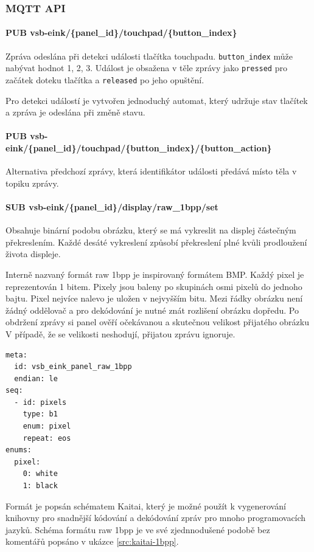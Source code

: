 \subsubsection*{MQTT API}
\paragraph*{PUB vsb-eink/\{panel\_id\}/touchpad/\{button\_index\}}
Zpráva odeslána při detekci události tlačítka touchpadu. \lstinline{button_index} může nabývat hodnot 1, 2, 3. Událost je obsažena v těle zprávy jako \verb|pressed| pro začátek doteku tlačítka a \verb|released| po jeho opuštění.

Pro detekci událostí je vytvořen jednoduchý automat, který udržuje stav tlačítek a zpráva je odeslána při změně stavu.

\paragraph*{PUB vsb-eink/\{panel\_id\}/touchpad/\{button\_index\}/\{button\_action\}}
Alternativa předchozí zprávy, která identifikátor události předává místo těla v topiku zprávy.

\paragraph*{SUB vsb-eink/\{panel\_id\}/display/raw\_1bpp/set}
Obsahuje binární podobu obrázku, který se má vykreslit na displej částečným překreslením. Každé desáté vykreslení způsobí překreslení plné kvůli prodloužení života displeje.

Interně nazvaný formát raw 1bpp je inspirovaný formátem BMP. Každý pixel je reprezentován 1 bitem. Pixely jsou baleny po skupinách osmi pixelů do jednoho bajtu. Pixel nejvíce nalevo je uložen v nejvyšším bitu. Mezi řádky obrázku není žádný oddělovač a pro dekódování je nutné znát rozlišení obrázku dopředu. Po obdržení zprávy si panel ověří očekávanou a skutečnou velikost přijatého obrázku V případě, že se velikosti neshodují, přijatou zprávu ignoruje.

\begin{lstlisting}[label=src:kaitai-1bpp,caption={Kaitai schéma formátu raw 1bpp}]
meta:
  id: vsb_eink_panel_raw_1bpp
  endian: le
seq:
  - id: pixels
    type: b1
    enum: pixel
    repeat: eos
enums:
  pixel:
    0: white
    1: black
\end{lstlisting}

Formát je popsán schématem Kaitai\cite{KaitaiioKaitai_struct2024}, který je možné použít k vygenerování knihovny pro snadnější kódování a dekódování zpráv pro mnoho programovacích jazyků. Schéma formátu raw 1bpp je ve své zjednnodušené podobě bez komentářů popsáno v ukázce \ref{src:kaitai-1bpp}.

